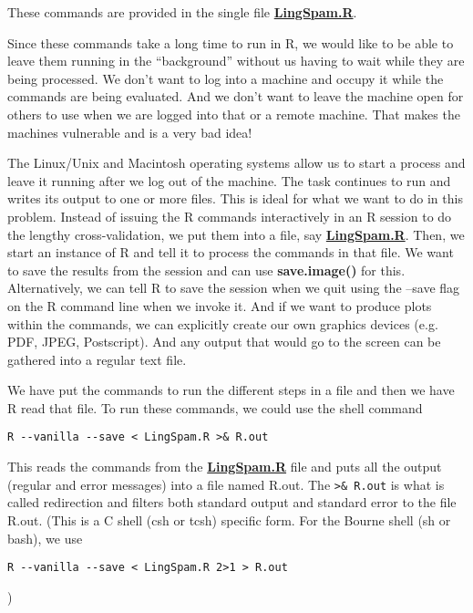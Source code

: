 \documentclass{article}
\def\SFunction#1{\textbf{#1()}}
\def\file#1{\HREF{http://winnie.ucdavis.edu/stat141/Winter04/Homework/NaieveBayes/Solutions/#1}{\textbf{#1}}}
\def\HREF#1#2{\href{#1}{#2}}
\begin{document}
These commands are provided in the single file
\file{LingSpam.R}.



Since these commands take a long time to run in R, we would like to be
able to leave them running in the ``background'' without us having to
wait while they are being processed.  We don't want to log into a
machine and occupy it while the commands are being evaluated.  And we
don't want to leave the machine open for others to use when we are
logged into that or a remote machine. That makes the machines
vulnerable and is a very bad idea!

The Linux/Unix and Macintosh operating systems allow us to start a
process and leave it running after we log out of the machine.  The
task continues to run and writes its output to one or more files.
This is ideal for what we want to do in this problem.  Instead of
issuing the R commands interactively in an R session to do the lengthy
cross-validation, we put them into a file, say \file{LingSpam.R}.  Then, we
start an instance of R and tell it to process the commands in that
file.  We want to save the results from the session and can use
\SFunction{save.image} for this.  Alternatively, we can tell R to save
the session when we quit using the --save flag on the R command line
when we invoke it.  And if we want to produce plots within the
commands, we can explicitly create our own graphics devices (e.g. PDF,
JPEG, Postscript).  And any output that would go to the screen can be
gathered into a regular text file.


We have put the commands to run the different steps in a file and then
we have R read that file.
To run these commands, we could use
the shell command
\begin{verbatim}
R --vanilla --save < LingSpam.R >& R.out
\end{verbatim}
This reads the commands from the \file{LingSpam.R} file and puts all the
output (regular and error messages) into a file named R.out.  The
\verb+>& R.out+ is what is called redirection and
filters both standard output and standard error
to the file R.out.
(This is a C shell (csh or tcsh) specific form.
For the Bourne shell (sh or bash), 
we use
\begin{verbatim}
R --vanilla --save < LingSpam.R 2>1 > R.out
\end{verbatim}
)
\end{document}
